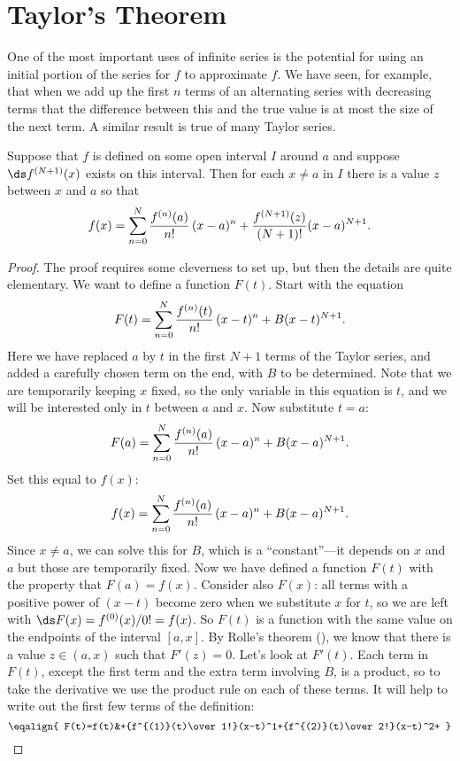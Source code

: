 \section{Taylor's Theorem}{}{}
\nobreak
One of the most important uses of infinite series is the potential for
using an initial portion of the series for $f$ to approximate $f$. We
have seen, for example, that when we add up the first $n$ terms of an
alternating series with decreasing terms that the difference between
this and the true value is at most the size of the next term. A
similar result is true of many Taylor series.

\begin{theorem} Suppose that $f$ is defined on some open interval $I$ around $a$ and
suppose $\ds f^{(N+1)}(x)$ exists on this interval. Then
for each $x\not=a$ in $I$ there is a value $z$ between
$x$ and $a$ so that
$$ 
  f(x) = \sum_{n=0}^N {f^{(n)}(a)\over n!}\,(x-a)^n + 
  {f^{(N+1)}(z)\over (N+1)!}(x-a)^{N+1}. 
$$ 
\begin{proof}
The proof requires some cleverness to set up, but then the details are
quite elementary. We want to define a function $F(t)$. 
Start with the equation
$$F(t)=\sum_{n=0}^N{f^{(n)}(t)\over n!}\,(x-t)^n + B(x-t)^{N+1}.$$
Here we have replaced $a$ by $t$ in the first $N+1$ terms of the
Taylor series, and added a carefully chosen term on the end, with $B$
to be determined. Note that
we are temporarily keeping $x$ fixed, so the only variable in this
equation is $t$, and we will be interested
only in $t$ between $a$ and $x$. Now substitute $t=a$:
$$F(a)=\sum_{n=0}^N{f^{(n)}(a)\over n!}\,(x-a)^n + B(x-a)^{N+1}.$$
Set this equal to $f(x)$:
$$f(x)=\sum_{n=0}^N{f^{(n)}(a)\over n!}\,(x-a)^n + B(x-a)^{N+1}.$$
Since $x\not=a$, we can solve this for $B$, which is a
``constant''---it depends on $x$ and $a$ but those are temporarily 
fixed.  Now we
have defined a function $F(t)$ with the property that
$F(a)=f(x)$. Consider also $F(x)$: all terms with a positive power of
$(x-t)$ become zero when we substitute $x$ for $t$, so we are left
with $\ds F(x)=f^{(0)}(x)/0!=f(x)$. So $F(t)$ is a function with the same
value on the endpoints of the interval $[a,x]$. 
By Rolle's theorem (), we
know that there is a value $z\in(a,x)$ such that $F'(z)=0$. Let's look
at $F'(t)$. Each term in $F(t)$, except the first term and the extra
term involving $B$, is a product, so to take the derivative we use the
product rule on each of these terms. It will help to write out the
first few terms of the definition:
$$\eqalign{
  F(t)=f(t)&+{f^{(1)}(t)\over 1!}(x-t)^1+{f^{(2)}(t)\over 2!}(x-t)^2+
}$$
\end{proof}
\end{theorem}
